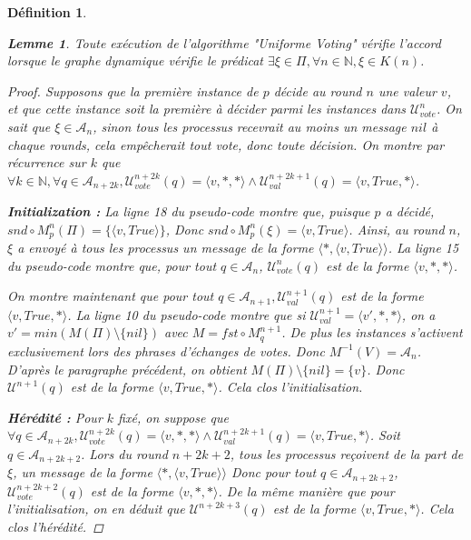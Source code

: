 \documentclass{article}
\newtheorem{lemma}{Lemme}
\newtheorem{definition}{Définition}
\begin{document}
\begin{definition}
\begin{lemma}
	Toute exécution de l'algorithme "Uniforme Voting" vérifie l'accord lorsque le graphe dynamique vérifie le prédicat $\exists \xi \in \Pi, \forall n \in \mathds{N}, \xi \in K(n)$.
\end{lemma}
\begin{proof}
	Supposons que la première instance de $p$ décide au round $n$ une valeur $v$, et que cette instance soit la première à décider parmi les instances dans $\mathcal{U}^n_{vote}$.
	On sait que $\xi \in \mathcal{A}_n$, sinon tous les processus recevrait au moins un message $nil$ à chaque rounds, cela empêcherait tout vote, donc toute décision.
	On montre par récurrence sur $k$ que
	$\forall k \in \mathds{N}, \forall q \in \mathcal{A}_{n+2k},
	\mathcal{U}_{vote}^{n+2k }(q) = \langle v, *, * \rangle \wedge
	\mathcal{U}_{val}^{n+2k+1}(q) = \langle v, True, * \rangle$.

	\textbf{Initialization :} La ligne 18 du pseudo-code montre que, puisque $p$ a décidé, $snd \circ M^n_p(\Pi) = \{\langle v, True \rangle\}$, Donc $snd \circ M^n_p(\xi) = \langle v, True \rangle$.
		Ainsi, au round $n$, $\xi$ a envoyé à tous les processus un message de la forme $\langle *, \langle v, True \rangle \rangle$.
		La ligne 15 du pseudo-code montre que, pour tout $q \in \mathcal{A}_n$, $\mathcal{U}_{vote}^n(q)$ est de la forme $\langle v, *, * \rangle$.

		On montre maintenant que pour tout $q \in \mathcal{A}_{n+1}, \mathcal{U}^{n+1}_{val}(q)$ est de la forme $\langle v, True, * \rangle$.
		La ligne 10 du pseudo-code montre que si $\mathcal{U}^{n+1}_{val} = \langle v', *, * \rangle$, on a $v' = min(M(\Pi) \setminus \{nil\})$ avec $M = fst \circ M_q^{n+1}$.
		De plus les instances s'activent exclusivement lors des phrases d'échanges de votes. Donc $M^{-1}(V) = \mathcal{A}_{n}$.
		D'après le paragraphe précédent, on obtient $M(\Pi) \setminus \{nil\} = \{v\}$. Donc $\mathcal{U}^{n+1}(q)$ est de la forme $\langle v, True, * \rangle$.
		Cela clos l'initialisation.

	\textbf{Hérédité :} Pour $k$ fixé, on suppose que $\forall q \in \mathcal{A}_{n+2k},
		\mathcal{U}_{vote}^{n+2k }(q) = \langle v, *, * \rangle \wedge
		\mathcal{U}_{val}^{n+2k+1}(q) = \langle v, True, * \rangle$.
		Soit $q \in \mathcal{A}_{n+2k+2}$.
		Lors du round $n+2k+2$, tous les processus reçoivent de la part de $\xi$, un message de la forme $\langle *, \langle v, True \rangle \rangle$
		Donc pour tout $q \in \mathcal{A}_{n+2k+2}$, $\mathcal{U}_{vote}^{n+2k+2}(q)$ est de la forme $\langle v, *, * \rangle$.
		De la même manière que pour l'initialisation, on en déduit que $\mathcal{U}^{n+2k+3}(q)$ est de la forme $\langle v, True, * \rangle$.
		Cela clos l'hérédité.


\end{proof}
\end{definition}
\end{document}
